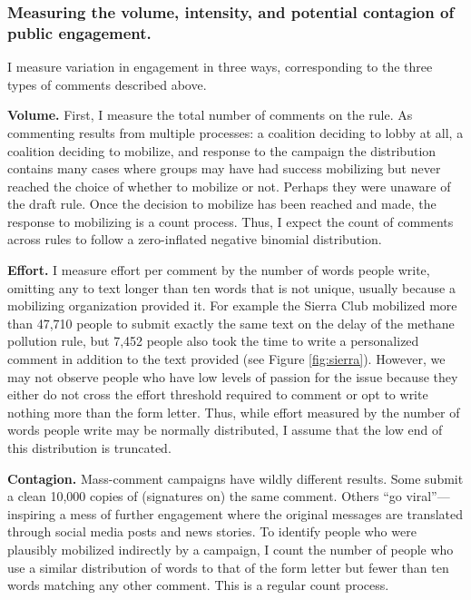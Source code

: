 \documentclass[
      12pt,
        ]{article}
\begin{document}
\hypertarget{measuring-the-volume-intensity-and-potential-contagion-of-public-engagement.}{%
\subsubsection{Measuring the volume, intensity, and potential contagion of public engagement.}\label{measuring-the-volume-intensity-and-potential-contagion-of-public-engagement.}}

I measure variation in engagement in three ways, corresponding to the
three types of comments described above.

\textbf{Volume.} First, I measure the total number of comments on the rule.
As commenting results from multiple processes: a coalition deciding to
lobby at all, a coalition deciding to mobilize, and response to the
campaign the distribution contains many cases where groups may have had
success mobilizing but never reached the choice of whether to mobilize
or not. Perhaps they were unaware of the draft rule. Once the decision
to mobilize has been reached and made, the response to mobilizing is a
count process. Thus, I expect the count of comments across rules to
follow a zero-inflated negative binomial distribution.

\textbf{Effort.} I measure effort per comment by the number of words people
write, omitting any to text longer than ten words that is not unique,
usually because a mobilizing organization provided it. For example the Sierra Club mobilized more than 47,710
people to submit exactly the same text on the delay of the methane
pollution rule, but 7,452 people also took the time to write a
personalized comment in addition to the text provided (see Figure \ref{fig:sierra}). However, we may
not observe people who have low levels of passion for the issue because
they either do not cross the effort threshold required to comment or opt
to write nothing more than the form letter. Thus, while effort measured
by the number of words people write may be normally distributed, I
assume that the low end of this distribution is truncated.

\textbf{Contagion.} Mass-comment campaigns have wildly different results.
Some submit a clean 10,000 copies of (signatures on) the same comment.
Others ``go viral''---inspiring a mess of further engagement where the
original messages are translated through social media posts and news
stories. To identify people who were plausibly mobilized indirectly by a
campaign, I count the number of people who use a similar distribution of
words to that of the form letter but fewer than ten words matching any
other comment. This is a regular count process.
\end{document}
